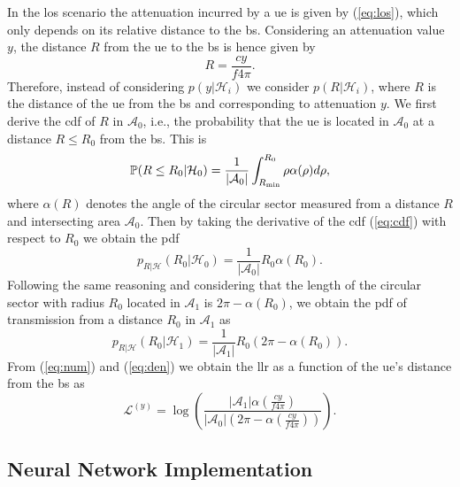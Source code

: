 \documentclass[conference,draftcls,onecolumn]{IEEEtran}
\begin{document}
In the \ac{los} scenario the attenuation incurred by a \ac{ue} is given by (\ref{eq:los}), which only depends on its relative distance to the \ac{bs}. Considering an attenuation value $y$, the distance $R$ from the \ac{ue} to the \ac{bs} is hence given by 
\begin{equation}
    R = \frac{c y}{f 4 \pi}.
\end{equation}
Therefore, instead of considering $p(y|\mathcal H_i)$ we consider $p(R|\mathcal H_i)$, where $R$ is the distance of the \ac{ue} from the \ac{bs} and corresponding to attenuation $y$. We first derive the \ac{cdf} of $R$ in $\mathcal{A}_0$, i.e.,  the probability that the \ac{ue} is located in $\mathcal{A}_0$ at a distance $R\le R_0$ from the \ac{bs}. This is
\begin{equation}\label{eq:cdf}
     \mathbb{P}(R \le R_0|\mathcal{H}_0) = \frac{1}{|\mathcal{A}_0|}\int_{R_{\rm min}}^{R_0} \rho \alpha(\rho) d\rho,
\end{equation}
where $\alpha(R)$ denotes the angle of the circular sector measured from a distance $R$ and intersecting area $\mathcal{A}_0$. Then by taking the derivative of the \ac{cdf} (\ref{eq:cdf}) with respect to $R_0$ we obtain the \ac{pdf} 
\begin{equation}\label{eq:num}
    p_{R|\mathcal{H}}(R_0|\mathcal{H}_0) = \frac{1}{|\mathcal{A}_0|}R_0\alpha(R_0).
\end{equation}
Following the same reasoning and considering that the length of the circular sector with radius $R_0$ located in $\mathcal{A}_1$ is $2\pi - \alpha(R_0)$, we obtain the \ac{pdf} of transmission from a distance $R_0$ in $\mathcal{A}_1$ as
\begin{equation}\label{eq:den}
     p_{R|\mathcal{H}}(R_0|\mathcal{H}_1) = \frac{1}{|\mathcal{A}_1|}R_0\left(2\pi-\alpha(R_0)\right).
\end{equation}
From (\ref{eq:num}) and (\ref{eq:den}) we obtain the \ac{llr} as a function of the \ac{ue}'s distance from the \ac{bs} as 
\begin{equation}
    \mathcal{L}^{(y)}=\log\left(\frac{|\mathcal{A}_1|\alpha(\frac{c y}{f 4 \pi})}{|\mathcal{A}_0|\left(2\pi-\alpha(\frac{c y}{f 4 \pi})\right)}\right).
\end{equation}

\subsection{Neural Network Implementation}\label{sec:nn}
\end{document}
